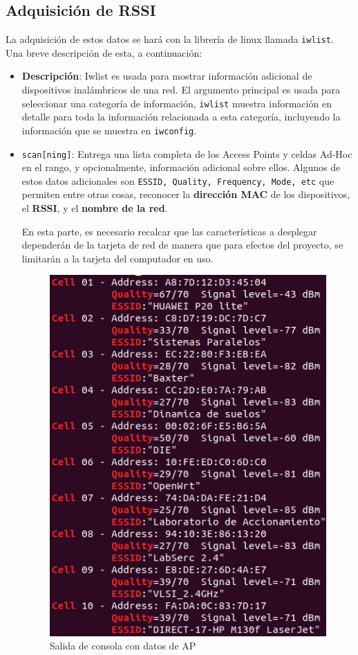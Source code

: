 \subsection{Adquisición de RSSI}
La adquisición de estos datos se hará con la librería de linux llamada \texttt{iwlist}. Una breve descripción de esta, a continuación:
\begin{itemize}
    \item {\textbf{Descripción}: Iwlist es usada para mostrar información adicional de dispositivos inalámbricos de una red. El argumento principal es usada para seleccionar una categoría de información, \texttt{iwlist} muestra información en detalle para toda la información relacionada a esta categoría, incluyendo la información que se muestra en \texttt{iwconfig}.\\}
    
    \item {\texttt{scan[ning]}: Entrega una lista completa de los Access Points y celdas Ad-Hoc en el rango, y opcionalmente, información adicional sobre ellos. Algunos de estos datos adicionales son \texttt{ESSID, Quality, Frequency, Mode, etc} que permiten entre otras cosas, reconocer la \textbf{dirección MAC} de los dispositivos, el \textbf{RSSI}, y el \textbf{nombre de la red}.
    
    En esta parte, es necesario recalcar que las características a desplegar dependerán de la tarjeta de red de manera que para efectos del proyecto, se limitarán a la tarjeta del computador en uso.\\
    }
    \begin{figure}[h!]
        \centering
        \includegraphics[scale=0.4]{./images/output}
        \caption{Salida de consola con datos de AP}
        \label{fig:output}
    \end{figure}
    

\end{itemize}
